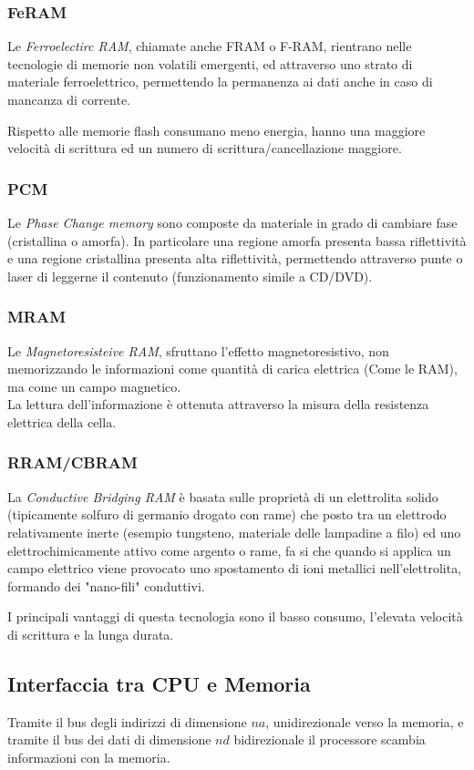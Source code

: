 \documentclass[../template]{subfiles}
\begin{document}
\subsubsection{FeRAM}
Le \textit{Ferroelectirc RAM}, chiamate anche FRAM o F-RAM, rientrano nelle tecnologie di memorie non volatili emergenti, ed attraverso uno strato di materiale ferroelettrico, permettendo la permanenza ai dati anche in caso di mancanza di corrente.

Rispetto alle memorie flash consumano meno energia, hanno una maggiore velocità di scrittura ed un numero di scrittura/cancellazione maggiore.
\subsubsection{PCM}
Le \textit{Phase Change memory} sono composte da materiale in grado di cambiare fase (cristallina o amorfa). In particolare una regione amorfa presenta bassa riflettività e una regione cristallina presenta alta riflettività, permettendo attraverso punte o laser di leggerne il contenuto (funzionamento simile a CD/DVD).

\subsubsection{MRAM}
Le \textit{Magnetoresisteive RAM}, sfruttano l'effetto magnetoresistivo, non memorizzando le informazioni come quantità di carica elettrica (Come le RAM), ma come un campo magnetico.
\\
La lettura dell'informazione è ottenuta attraverso la misura della resistenza elettrica della cella.

\subsubsection{RRAM/CBRAM}
La \textit{Conductive Bridging RAM} è basata sulle proprietà di un elettrolita solido (tipicamente solfuro di germanio drogato con rame) che posto tra un elettrodo relativamente inerte (esempio tungsteno, materiale delle lampadine a filo) ed uno elettrochimicamente attivo  come argento o rame, fa si che quando si applica un campo elettrico viene provocato uno spostamento di ioni metallici nell'elettrolita, formando dei "nano-fili" conduttivi.

I principali vantaggi di questa tecnologia sono il basso consumo, l'elevata velocità di scrittura e la lunga durata.

\subsection{Interfaccia tra CPU e Memoria}
Tramite il bus degli indirizzi di dimensione $na$, unidirezionale verso la memoria, e tramite il bus dei dati di dimensione $nd$ bidirezionale il processore scambia informazioni con la memoria.
\end{document}
